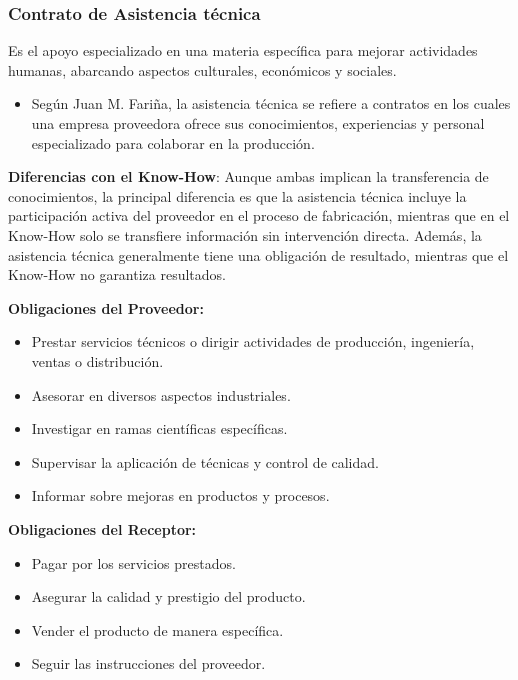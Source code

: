 \documentclass{templateNote}
\begin{document}
\subsubsection{Contrato de Asistencia técnica}
Es el apoyo especializado en una materia específica para mejorar actividades humanas, abarcando aspectos culturales, económicos y sociales.

\begin{itemize}
    \item Según Juan M. Fariña, la asistencia técnica se refiere a contratos en los cuales una empresa proveedora ofrece sus conocimientos, experiencias y personal especializado para colaborar en la producción.
\end{itemize}

\textbf{Diferencias con el Know-How}: Aunque ambas implican la transferencia de conocimientos, la principal diferencia es que la asistencia técnica incluye la participación activa del proveedor en el proceso de fabricación, mientras que en el Know-How solo se transfiere información sin intervención directa. Además, la asistencia técnica generalmente tiene una obligación de resultado, mientras que el Know-How no garantiza resultados.

\begin{table}[H]
    \centering
    \begin{minipage}[t]{0.45\textwidth}
        \textbf{Obligaciones del Proveedor:}
        \begin{itemize}
            \item Prestar servicios técnicos o dirigir actividades de producción, ingeniería, ventas o distribución.
            \item Asesorar en diversos aspectos industriales.
            \item Investigar en ramas científicas específicas.
            \item Supervisar la aplicación de técnicas y control de calidad.
            \item Informar sobre mejoras en productos y procesos.
        \end{itemize}
    \end{minipage}
    \hfill
    \begin{minipage}[t]{0.45\textwidth}
        \textbf{Obligaciones del Receptor:}
        \begin{itemize}
            \item Pagar por los servicios prestados.
            \item Asegurar la calidad y prestigio del producto.
            \item Vender el producto de manera específica.
            \item Seguir las instrucciones del proveedor.
        \end{itemize}
    \end{minipage}
\end{table}
\end{document}
